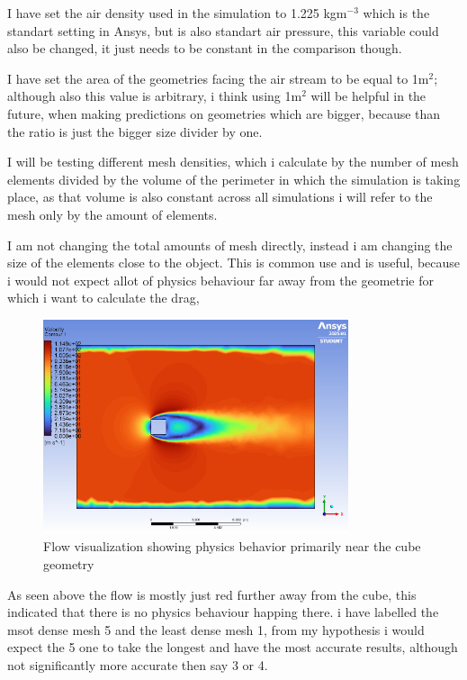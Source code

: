 \documentclass[12pt,a4paper]{article}
\begin{document}
I have set the air density used in the simulation to 1.225 kgm$^{-3}$ which is the standart setting in Ansys, but is also standart air pressure, this variable could also be changed, it just needs to be constant in the comparison though.

 I have set the area of the geometries facing the air stream to be equal to 1m$^2$; although also this value is arbitrary, i think using 1m$^2$ will be helpful in the future, when making predictions on geometries which are bigger, because than the ratio is just the bigger size divider by one. 

I will be testing different mesh densities, which i calculate by the number of mesh elements divided by the volume of the perimeter in which the simulation is taking place, as that volume is also constant across all simulations i will refer to the mesh only by the amount of elements.

I am not changing the total amounts of mesh directly, instead i am changing the size of the elements close to the object. This is common use and is useful, because i would not expect allot of physics behaviour far away from the geometrie for which i want to calculate the drag, 

\begin{figure}[H]
    \centering
    \includegraphics[width=0.8\textwidth]{image1.png}
    \caption{Flow visualization showing physics behavior primarily near the cube geometry}
    \label{fig:flow_viz}
\end{figure}

As seen above the flow is mostly just red further away from the cube, this indicated that there is no physics behaviour happing there. i have labelled the msot dense mesh 5 and the least dense mesh 1, from my hypothesis i would expect the 5 one to take the longest and have the most accurate results, although not significantly more accurate then say 3 or 4. 
\end{document}
